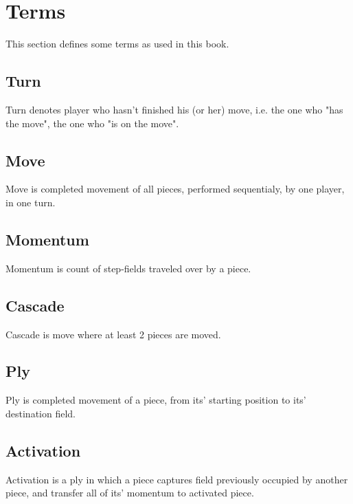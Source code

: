 

\chapter*{Terms}
\label{ch:Terms}
This section defines some terms as used in this book.

\section*{Turn}
\label{sec:Terms/Turn}
Turn denotes player who hasn't finished his (or her) move, i.e. the one who "has the move",
the one who "is on the move".

\section*{Move}
\label{sec:Terms/Move}
Move is completed movement of all pieces, performed sequentialy, by one player, in one turn.

\section*{Momentum}
\label{sec:Terms/Momentum}
Momentum is count of step-fields traveled over by a piece.

\section*{Cascade}
\label{sec:Terms/Cascade}
Cascade is move where at least 2 pieces are moved.

\section*{Ply}
\label{sec:Terms/Ply}
Ply is completed movement of a piece, from its' starting position to its' destination field.

\section*{Activation}
\label{sec:Terms/Activation}
Activation is a ply in which a piece captures field previously occupied by another piece,
and transfer all of its' momentum to activated piece.

